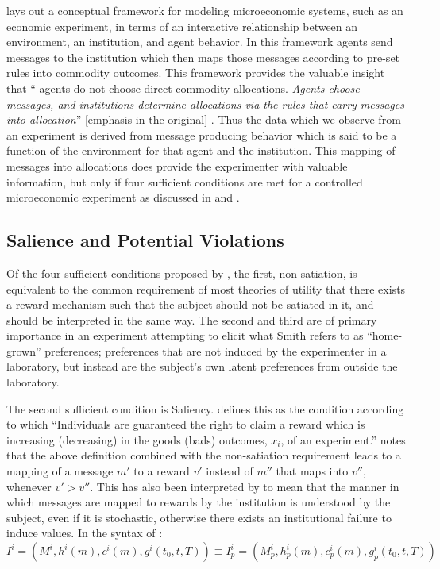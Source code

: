 \documentclass[../main.tex]{subfiles}
\begin{document}
\textcite{Smith1982} lays out a conceptual framework for modeling microeconomic systems, such as an economic experiment, in terms of an interactive relationship between an environment, an institution, and agent behavior.
In this framework agents send messages to the institution which then maps those messages according to pre-set rules into commodity outcomes.
This framework provides the valuable insight that \enquote{\textelp{} agents do not choose direct commodity allocations.
\textit{Agents choose messages, and institutions determine allocations via the rules that carry messages into allocation}} [emphasis in the original] \parencite[926]{Smith1982}.
Thus the data which we observe from an experiment is derived from message producing behavior which is said to be a function of the environment for that agent and the institution.
This mapping of messages into allocations does provide the experimenter with valuable information, but only if four sufficient conditions are met for a controlled microeconomic experiment as discussed in \textcite{Smith1982} and \textcite{Harrison1989}.

\singlespacing
\subsection{Salience and Potential Violations}
\doublespacing

Of the four sufficient conditions proposed by \textcite{Smith1982}, the first, non-satiation, is equivalent to the common requirement of most theories of utility that there exists a reward mechanism such that the subject should not be satiated in it, and should be interpreted in the same way.
The second and third are of primary importance in an experiment attempting to elicit what Smith refers to as \enquote{home-grown} preferences; preferences that are not induced by the experimenter in a laboratory, but instead are the subject's own latent preferences from outside the laboratory.


The second sufficient condition is Saliency.
\textcite[931]{Smith1982} defines this as the condition according to which \enquote{Individuals are guaranteed the right to claim a reward which is increasing (decreasing) in the goods (bads) outcomes, $x_i$, of an experiment.}
\textcite[223]{Harrison1994} notes that the above definition combined with the non-satiation requirement leads to a mapping of a message $m'$ to a reward $v'$ instead of $m''$ that maps into $v''$, whenever $v' > v''$.
This has also been interpreted by \textcite{Bruner2011} to mean that the manner in which messages are mapped to rewards by the institution is understood by the subject, even if it is stochastic, otherwise there exists an institutional failure to induce values.
In the syntax of \textcite{Smith1982}:
\begin{equation}
	\label{eq:S1982:I}
	I^i = \left(M^i,h^i(m),c^i(m),g^i(t_0,t,T) \right) \equiv I^i_p = \left(M^i_p, h^i_p(m) ,c^i_p(m), g^i_p(t_0,t,T) \right)
\end{equation}
\end{document}
